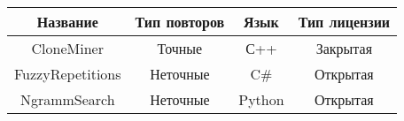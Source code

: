 \begin{minipage}{0.9\textwidth}
\begin{adjustbox}{center}
\begin{tabular}{|c|c|c|c|}
	\hline
	Название & Тип повторов & Язык & Тип лицензии \\
	\hline
	\hline
	CloneMiner & Точные & С++ & Закрытая \\
	\hline
	FuzzyRepetitions & Неточные & C\# & Открытая \\
	\hline
	NgrammSearch & Неточные & Python & Открытая \\
	\hline
\end{tabular}
\end{adjustbox}
\end{minipage}
